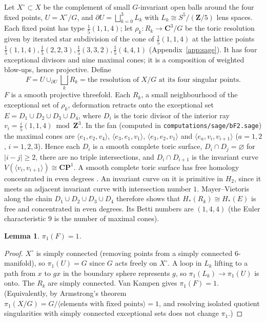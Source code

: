 \documentclass[11pt]{amsart}
\numberwithin{equation}{section}
\newtheorem{lemma}[theorem]{Lemma}
\theoremstyle{definition}
\theoremstyle{remark}
\newcommand{\CP}{\mathbf{CP}}
\newcommand{\Z}{\mathbf Z}
\newcommand{\C}{\mathbf C}
\begin{document}
Let $X^\circ\subset X$ be the complement of small $G$-invariant open balls
around the four fixed points, $U=X^\circ/G$, and $\partial U=\bigsqcup_{k=0}^3L_k$
with $L_k\cong S^5/(\Z/5)$ lens spaces. Each fixed point has type
$\frac15(1,1,4)$; let $\rho_k\colon R_k\to\C^3/G$ be the toric resolution
given by iterated star subdivision of the cone of $\frac15(1,1,4)$ at
the lattice points $\frac15(1,1,4),\frac15(2,2,3),\frac15(3,3,2),
\frac15(4,4,1)$ (Appendix~\ref{app:sage}). It has four exceptional
divisors and nine maximal cones; it is a composition of weighted blow-ups,
hence projective. Define
\[
  F=U\cup_{\partial U}\textstyle\bigsqcup_kR_k
  =\text{the resolution of }X/G\text{ at its four singular points.}
\]
$F$ is a smooth projective threefold. Each $R_k$, a small neighbourhood
of the exceptional set of $\rho_k$, deformation retracts onto the
exceptional set $E=D_1\cup D_2\cup D_3\cup D_4$, where $D_i$ is the toric
divisor of the interior ray $v_i=\frac i5(1,1,4)\bmod\Z^3$. In the fan
(computed in \nolinkurl{computations/sage/bF2.sage}) the maximal cones are
$\langle e_1,e_2,v_4\rangle$, $\langle e_3,e_1,v_1\rangle$,
$\langle e_3,e_2,v_1\rangle$ and $\langle e_a,v_i,v_{i+1}\rangle$
($a=1,2$, $i=1,2,3$). Hence each $D_i$ is a smooth complete toric surface,
$D_i\cap D_j=\varnothing$ for $|i-j|\ge2$, there are no triple
intersections, and $D_i\cap D_{i+1}$ is the invariant curve
$V(\langle v_i,v_{i+1}\rangle)\cong\CP^1$. A smooth complete toric surface
has free homology concentrated in even degrees \cite[\S5.2,
pp.~101--103]{Fulton1993}. An invariant curve on it is primitive in $H_2$,
since it meets an adjacent invariant curve with intersection number $1$.
Mayer--Vietoris along the chain $D_1\cup D_2\cup D_3\cup D_4$ therefore
shows that $H_*(R_k)\cong H_*(E)$ is free and concentrated in even
degrees. Its Betti numbers are $(1,4,4)$ (the Euler characteristic $9$ is
the number of maximal cones).

\begin{lemma}\label{lem:pi1F}
$\pi_1(F)=1$.
\end{lemma}

\begin{proof}
$X^\circ$ is simply connected (removing points from a simply connected
$6$-manifold), so $\pi_1(U)=G$ since $G$ acts freely on $X^\circ$. A loop in
$L_k$ lifting to a path from $x$ to $gx$ in the boundary sphere represents
$g$, so $\pi_1(L_k)\to\pi_1(U)$ is onto. The $R_k$ are simply connected.
Van Kampen gives $\pi_1(F)=1$. (Equivalently, by Armstrong's theorem
\cite{Armstrong1968} $\pi_1(X/G)=G/\langle\text{elements with fixed
points}\rangle=1$, and resolving isolated quotient singularities with
simply connected exceptional sets does not change $\pi_1$.)
\end{proof}
\end{document}

